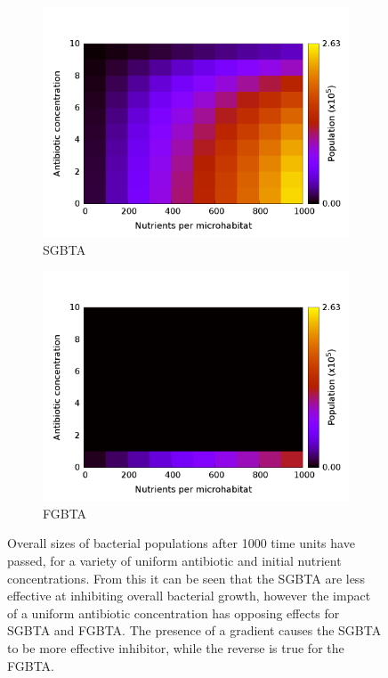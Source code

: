 \documentclass[a4paper,12pt]{article}
\begin{document}
\begin{figure}[H]
 \centering
 \begin{subfigure}[h]{0.49\textwidth}
 \includegraphics[width=\textwidth]{simple-slowGrowers-S_Vs_C-contours}
  \caption{SGBTA}
  \label{subfig:SGBTA-const_C-contours}
  \end{subfigure}
  \begin{subfigure}[h]{0.49\textwidth}
  \includegraphics[width=\textwidth]{simple-fastGrowers-S_Vs_C-contours}
  \caption{FGBTA}
  \label{subfig:FGBTA-const_C-contours}
 \end{subfigure}
\caption{Overall sizes of bacterial populations after 1000 time units have passed, for a variety of uniform antibiotic and initial nutrient concentrations.  
From this it can be seen that the SGBTA are less effective at inhibiting overall bacterial growth, however the impact of a uniform antibiotic concentration has opposing effects 
for SGBTA and FGBTA.  The presence of a gradient causes the SGBTA to be more effective inhibitor, while the reverse is true for the FGBTA.}
\label{fig:const_C-popsize-contours}
\end{figure}
\end{document}
